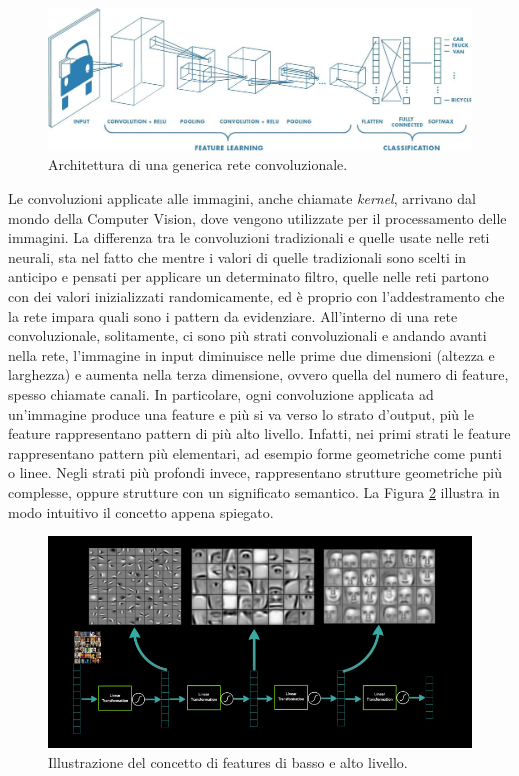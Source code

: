 \begin{figure}[h!]
  \hspace*{0.1in}
  \includegraphics[scale=0.3]{img/conv_net.jpeg}
  \caption{Architettura di una generica rete convoluzionale.}
  \label{fig:conv_net}
\end{figure}

Le convoluzioni applicate alle immagini, anche chiamate \textit{kernel}, arrivano dal mondo della Computer Vision, dove vengono utilizzate per il processamento delle immagini. La differenza tra le convoluzioni tradizionali e quelle usate nelle reti neurali, sta nel fatto che mentre i valori di quelle tradizionali sono scelti in anticipo e pensati per applicare un determinato filtro, quelle nelle reti partono con dei valori inizializzati randomicamente, ed è proprio con l'addestramento che la rete impara quali sono i pattern da evidenziare. All'interno di una rete convoluzionale, solitamente, ci sono più strati convoluzionali e andando avanti nella rete, l'immagine in input diminuisce nelle prime due dimensioni (altezza e larghezza) e aumenta nella terza dimensione, ovvero quella del numero di feature, spesso chiamate canali. In particolare, ogni convoluzione applicata ad un'immagine produce una feature e più si va verso lo strato d'output, più le feature rappresentano pattern di più alto livello. Infatti, nei primi strati le feature rappresentano pattern più elementari, ad esempio forme geometriche come punti o linee. Negli strati più profondi invece, rappresentano strutture geometriche più complesse, oppure strutture con un significato semantico. La Figura \ref{fig:features} illustra in modo intuitivo il concetto appena spiegato.

\begin{figure}[h!]
  \hspace*{0.3in}
  \includegraphics[scale=0.45]{img/features.png}
  \caption{Illustrazione del concetto di features di basso e alto livello.}
  \label{fig:features}
\end{figure}


